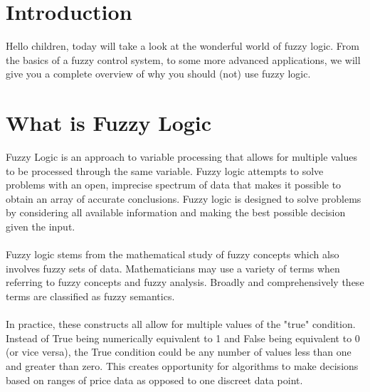 \documentclass[fleqn,10pt]{SelfArx} %
\begin{document}
\flushbottom %

\maketitle %

\tableofcontents %

\thispagestyle{empty} %


\section*{Introduction} %

Hello children, today will take a look at the wonderful world of fuzzy logic. From the basics of a fuzzy control system, to some more advanced applications, we will give you a complete overview of why you should (not) use fuzzy logic. \\

\section{What is Fuzzy Logic}
Fuzzy Logic is an approach to variable processing that allows for multiple values to be processed through the same variable. Fuzzy logic attempts to solve problems with an open, imprecise spectrum of data that makes it possible to obtain an array of accurate conclusions. Fuzzy logic is designed to solve problems by considering all available information and making the best possible decision given the input.\\ \\
Fuzzy logic stems from the mathematical study of fuzzy concepts which also involves fuzzy sets of data. Mathematicians may use a variety of terms when referring to fuzzy concepts and fuzzy analysis. Broadly and comprehensively these terms are classified as fuzzy semantics.\\ \\
In practice, these constructs all allow for multiple values of the "true" condition. Instead of True being numerically equivalent to 1 and False being equivalent to 0 (or vice versa), the True condition could be any number of values less than one and greater than zero. This creates opportunity for algorithms to make decisions based on ranges of price data as opposed to one discreet data point.\\
\end{document}
